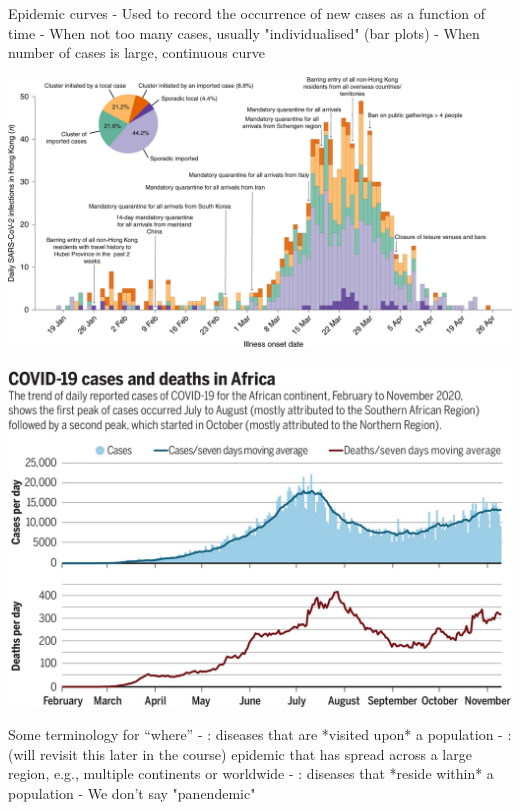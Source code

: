 \documentclass[aspectratio=169]{beamer}\usepackage[]{graphicx}\usepackage[]{xcolor}
\begin{document}
\begin{frame}{Epidemic curves}
- Used to record the occurrence of new cases as a function of time
\vfill
- When not too many cases, usually "individualised" (bar plots)
\vfill
- When number of cases is large, continuous curve
\end{frame}


\begin{frame}
    \includegraphics[width=\textwidth]{FIGS/41591_2020_1092_Fig1_HTML.png}
\end{frame}


\begin{frame}
    \includegraphics[width=\textwidth]{FIGS/371_27_f1.jpeg}
\end{frame}


\begin{frame}{Some terminology for ``where''}
- : diseases that are *visited upon* a population
\vfill
- : (will revisit this later in the course) epidemic that has spread across a large region, e.g., multiple continents or worldwide
\vfill
- : diseases that *reside within* a population
\vfill
- We don't say "panendemic"
\end{frame}
\end{document}
